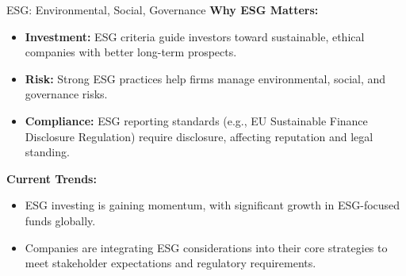 \documentclass[aspectratio=169, 10pt]{beamer}
\begin{document}
\begin{frame}{ESG: Environmental, Social, Governance}
\textbf{Why ESG Matters:}
\begin{itemize}
  \item \textbf{Investment:} ESG criteria guide investors toward sustainable, ethical companies with better long-term prospects.
  \item \textbf{Risk:} Strong ESG practices help firms manage environmental, social, and governance risks.
  \item \textbf{Compliance:} ESG reporting standards (e.g., EU Sustainable Finance Disclosure Regulation) require disclosure, affecting reputation and legal standing.
\end{itemize}

\vspace{0.5em}

\textbf{Current Trends:}
\begin{itemize}
  \item ESG investing is gaining momentum, with significant growth in ESG-focused funds globally.
  \item Companies are integrating ESG considerations into their core strategies to meet stakeholder expectations and regulatory requirements.
\end{itemize}
\end{frame}
\end{document}
